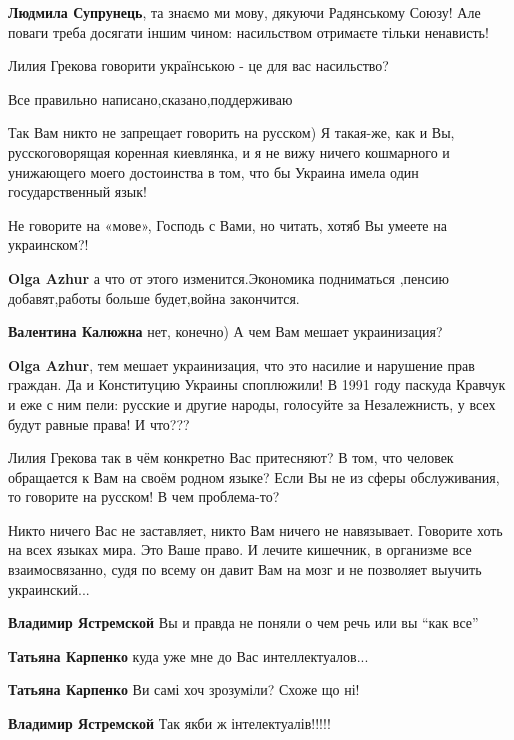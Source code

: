 \begin{itemize}
\textbf{Людмила Супрунець}, та знаємо ми мову, дякуючи Радянському Союзу! Але поваги треба досягати іншим чином: насильством отримаєте тільки ненависть!

Лилия Грекова говорити українською - це для вас насильство?
\end{itemize}

Все правильно написано,сказано,поддерживаю


Так Вам никто не запрещает говорить на русском) Я такая-же, как и Вы,
русскоговорящая коренная киевлянка, и я не вижу ничего кошмарного и унижающего
моего достоинства в том, что бы Украина имела один государственный язык!

Не говорите на «мове», Господь с Вами, но читать, хотяб Вы умеете на украинском?!

\textbf{Olga Azhur} а что от этого изменится.Экономика подниматься ,пенсию добавят,работы больше будет,война закончится.

\textbf{Валентина Калюжна} нет, конечно) А чем Вам мешает украинизация?

\textbf{Olga Azhur}, тем мешает украинизация, что это насилие и нарушение прав
граждан. Да и Конституцию Украины споплюжили! В 1991 году паскуда Кравчук и еже
с ним пели: русские и другие народы, голосуйте за Незалежнисть, у всех будут
равные права! И что???


Лилия Грекова так в чём конкретно Вас притесняют? В том, что человек обращается
к Вам на своём родном языке? Если Вы не из сферы обслуживания, то говорите на
русском! В чем проблема-то?


Никто ничего Вас не заставляет, никто Вам ничего не навязывает. Говорите хоть
на всех языках мира. Это Ваше право. И лечите кишечник, в организме все
взаимосвязанно, судя по всему он давит Вам на мозг и не позволяет выучить
украинский...

\begin{itemize}
\textbf{Владимир Ястремской} Вы и правда не поняли о чем речь или вы \enquote{как все}

\textbf{Татьяна Карпенко} куда уже мне до Вас интеллектуалов...

\textbf{Татьяна Карпенко} Ви самі хоч зрозуміли? Схоже що ні!

\textbf{Владимир Ястремской} Так якби ж інтелектуалів!!!!!
\end{itemize}

